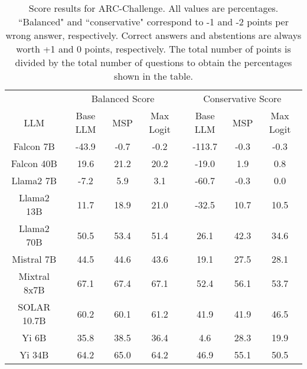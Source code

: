 \begin{table*}
\centering
\begin{tabular}{c|c|c|c|c|c|c}
& \multicolumn{3}{c|}{Balanced Score} & \multicolumn{3}{c}{Conservative Score} \\ 
LLM & Base LLM & MSP & Max Logit & Base LLM & MSP & Max Logit\\ \hline
Falcon 7B & -43.9 & -0.7 & -0.2 & -113.7 & -0.3 & -0.3\\
Falcon 40B & 19.6 & 21.2 & 20.2 & -19.0 & 1.9 & 0.8\\
Llama2 7B & -7.2 & 5.9 & 3.1 & -60.7 & -0.3 & 0.0\\
Llama2 13B & 11.7 & 18.9 & 21.0 & -32.5 & 10.7 & 10.5\\
Llama2 70B & 50.5 & 53.4 & 51.4 & 26.1 & 42.3 & 34.6\\
Mistral 7B & 44.5 & 44.6 & 43.6 & 19.1 & 27.5 & 28.1\\
Mixtral 8x7B & 67.1 & 67.4 & 67.1 & 52.4 & 56.1 & 53.7\\
SOLAR 10.7B & 60.2 & 60.1 & 61.2 & 41.9 & 41.9 & 46.5\\
Yi 6B & 35.8 & 38.5 & 36.4 & 4.6 & 28.3 & 19.9\\
Yi 34B & 64.2 & 65.0 & 64.2 & 46.9 & 55.1 & 50.5\\
\hline
\end{tabular}
\caption{Score results for ARC-Challenge. All values are percentages. ``Balanced" and ``conservative" correspond to -1 and -2 points per wrong answer, respectively. Correct answers and abstentions are always worth +1 and 0 points, respectively. The total number of points is divided by the total number of questions to obtain the percentages shown in the table.}
\label{tab:arc_score}
\end{table*}
